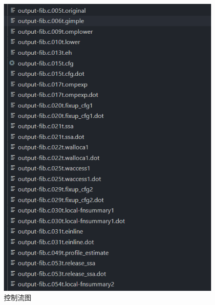 \documentclass[UTF8,a4paper,10pt]{ctexart}
\begin{document}
\begin{figure}[H]
  \centering
  \includegraphics[width=\textwidth]{figure/gcc.png}
  \caption{控制流图}
  \label{pic:4}
\end{figure}
\end{document}
